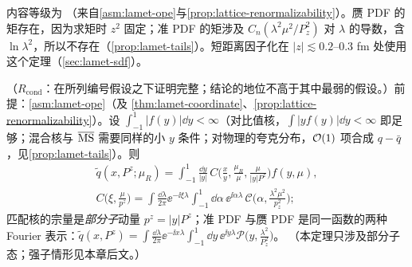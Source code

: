 内容等级为 \tagA（来自\cref{asm:lamet-ope}与\cref{prop:lattice-renormalizability}）。赝 PDF 的矩存在，因为求矩时 $z^2$ 固定；准 PDF 的矩涉及 $C_n(\lambda^2\mu^2/P_z^2)$ 对 $\lambda$ 的导数，含 $\ln\lambda^2$，所以不存在（\cref{prop:lamet-tails}）。短距离因子化在 $|z|\lesssim0.2$--$0.3$ fm 处使用这个定理（\cref{sec:lamet-sdf}）。

\begin{theorem}\label{thm:lamet-parton-momentum}
（$R_{\mathrm{cond}}$：在所列编号假设之下证明完整；结论的地位不高于其中最弱的假设。）前提：\cref{asm:lamet-ope}（及 \cref{thm:lamet-coordinate}、\cref{prop:lattice-renormalizability}）。设 $\int_{-1}^1|f(y)|\dd y<\infty$（对比值核，$\int|yf(y)|\dd y<\infty$ 即足够；混合核与 $\overline{\mathrm{MS}}$ 需要同样的小 $y$ 条件；对物理的夸克分布，$\mathcal{O}\!\left(1\right)$ 项合成 $q-\bar q$，见\cref{prop:lamet-tails}）。则
\begin{equation}\label{eq:lamet-mom-fact}
\begin{gathered}
\tilde q(x,P^z;\mu_R)=\int_{-1}^1\frac{\dd y}{|y|}\,C\Big(\frac xy,\frac{\mu_R}\mu,\frac\mu{|y|P^z}\Big)f(y,\mu),\\
C\Big(\xi,\frac\mu{p^z}\Big)=\int\frac{\dd\lambda}{2\pi}\ee^{-\ii\xi\lambda}\int_{-1}^1\dd\alpha\,\ee^{\ii\alpha\lambda}\,\mathcal C\Big(\alpha,\frac{\lambda^2\mu^2}{p_z^2}\Big);
\end{gathered}
\end{equation}%
匹配核的宗量是\emph{部分子}动量 $p^z=|y|P^z$；准 PDF 与赝 PDF 是同一函数的两种 Fourier 表示：$\tilde q(x,P^z)=\int\frac{\dd\lambda}{2\pi}\ee^{-\ii x\lambda}\int_{-1}^1\dd y\,\ee^{\ii y\lambda}\mathcal P\big(y,\frac{\lambda^2}{P_z^2}\big)$。
（本定理只涉及部分子态；强子情形见本章后文。）
\end{theorem}

